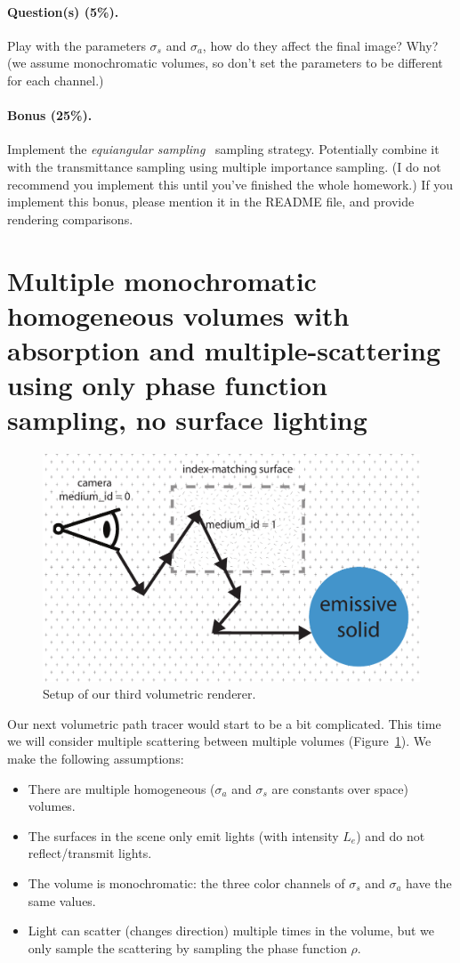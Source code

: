 \paragraph{Question(s) (5\%).} Play with the parameters $\sigma_s$ and $\sigma_a$, how do they affect the final image? Why? (we assume monochromatic volumes, so don't set the parameters to be different for each channel.)

\paragraph{Bonus (25\%).} Implement the \emph{equiangular sampling}~\cite{Kulla:2012:IST} sampling strategy. Potentially combine it with the transmittance sampling using multiple importance sampling. (I do not recommend you implement this until you've finished the whole homework.) If you implement this bonus, please mention it in the README file, and provide rendering comparisons.

\section{Multiple monochromatic homogeneous volumes with absorption and multiple-scattering using only phase function sampling, no surface lighting}
\begin{figure}
\includegraphics[width=\linewidth]{imgs/multiple_scattering.pdf}
\caption{Setup of our third volumetric renderer.}
\label{fig:volpath3_illustration}
\end{figure}
Our next volumetric path tracer would start to be a bit complicated. This time we will consider multiple scattering between multiple volumes (Figure~\ref{fig:volpath3_illustration}). We make the following assumptions:
\begin{itemize}
    \item There are multiple homogeneous ($\sigma_a$ and $\sigma_s$ are constants over space) volumes.
    \item The surfaces in the scene only emit lights (with intensity $L_e$) and do not reflect/transmit lights.
    \item The volume is monochromatic: the three color channels of $\sigma_s$ and $\sigma_a$ have the same values.
    \item Light can scatter (changes direction) multiple times in the volume, but we only sample the scattering by sampling the phase function $\rho$.
\end{itemize}

